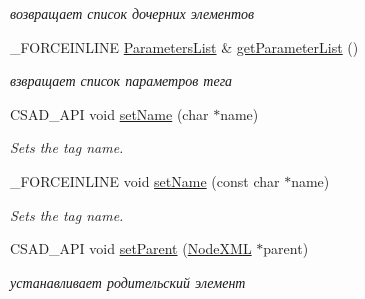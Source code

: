 \begin{DoxyCompactItemize}
\begin{DoxyCompactList}\small\item\em возвращает список дочерних элементов \end{DoxyCompactList}\item 
\hypertarget{classcsad_1_1_node_x_m_l_a6f445711ee951f55e6a675167b8826b4}{\-\_\-\-F\-O\-R\-C\-E\-I\-N\-L\-I\-N\-E \hyperlink{classbt_1_1_parameters_list}{Parameters\-List} \& \hyperlink{classcsad_1_1_node_x_m_l_a6f445711ee951f55e6a675167b8826b4}{get\-Parameter\-List} ()}\label{classcsad_1_1_node_x_m_l_a6f445711ee951f55e6a675167b8826b4}

\begin{DoxyCompactList}\small\item\em взвращает список параметров тега \end{DoxyCompactList}\item 
\hypertarget{classcsad_1_1_node_x_m_l_a5081573b0ee193c4378399171258bf66}{C\-S\-A\-D\-\_\-\-A\-P\-I void \hyperlink{classcsad_1_1_node_x_m_l_a5081573b0ee193c4378399171258bf66}{set\-Name} (char $\ast$name)}\label{classcsad_1_1_node_x_m_l_a5081573b0ee193c4378399171258bf66}

\begin{DoxyCompactList}\small\item\em Sets the tag name. \end{DoxyCompactList}\item 
\hypertarget{classcsad_1_1_node_x_m_l_a59d3af4891f5a5a329c0e220e3926a1b}{\-\_\-\-F\-O\-R\-C\-E\-I\-N\-L\-I\-N\-E void \hyperlink{classcsad_1_1_node_x_m_l_a59d3af4891f5a5a329c0e220e3926a1b}{set\-Name} (const char $\ast$name)}\label{classcsad_1_1_node_x_m_l_a59d3af4891f5a5a329c0e220e3926a1b}

\begin{DoxyCompactList}\small\item\em Sets the tag name. \end{DoxyCompactList}\item 
\hypertarget{classcsad_1_1_node_x_m_l_ab8ce317238560771c7adbce5c0fc7e95}{C\-S\-A\-D\-\_\-\-A\-P\-I void \hyperlink{classcsad_1_1_node_x_m_l_ab8ce317238560771c7adbce5c0fc7e95}{set\-Parent} (\hyperlink{classcsad_1_1_node_x_m_l}{Node\-X\-M\-L} $\ast$parent)}\label{classcsad_1_1_node_x_m_l_ab8ce317238560771c7adbce5c0fc7e95}

\begin{DoxyCompactList}\small\item\em устанавливает родительский элемент \end{DoxyCompactList}\end{DoxyCompactItemize}


